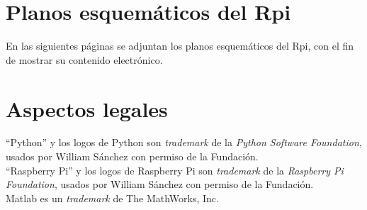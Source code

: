 \documentclass[11pt,lettersize]{article} %
\begin{document}
\appendix
\cleardoublepage 
\section{Planos esquemáticos del Rpi}
En las siguientes páginas se adjuntan los planos esquemáticos del Rpi, con el fin de mostrar su contenido electrónico.
%







\cleardoublepage {}
\section*{Aspectos legales}

``Python'' y los logos de Python son \textit{trademark} de la \textit{Python Software Foundation}, usados por William Sánchez con permiso de la Fundación. \\


``Raspberry Pi'' y los logos de Raspberry Pi son \textit{trademark} de la \textit{Raspberry Pi Foundation}, usados por William Sánchez con permiso de la Fundación. \\


Matlab es un \textit{trademark} de The MathWorks, Inc.




%
\end{document}
